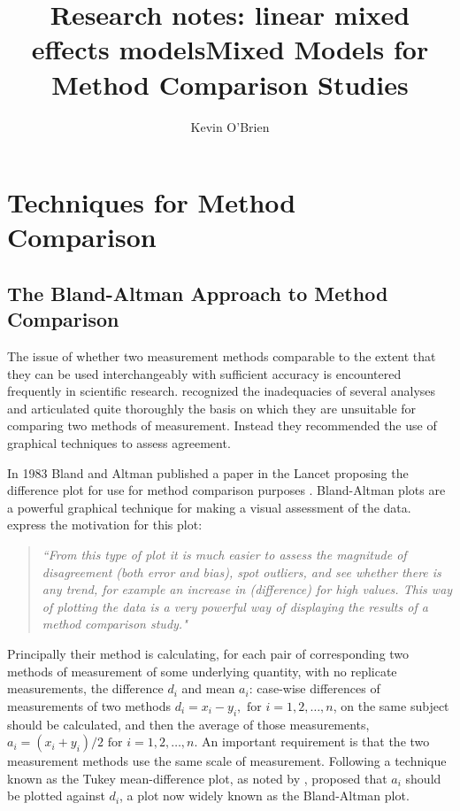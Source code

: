 \documentclass[12pt, a4paper]{report}
\title{Research notes: linear mixed effects models}
\author{ } \date{ }
\theoremstyle{plain}
\theoremstyle{definition}
\theoremstyle{remark}
\begin{document}
	\author{Kevin O'Brien}
	\title{Mixed Models for Method Comparison Studies}
	\tableofcontents
	
	\newpage
	\chapter{Techniques for Method Comparison}
	\section{The Bland-Altman Approach to Method Comparison}
	
The issue of whether two measurement methods comparable to the 	extent that they can be used interchangeably with sufficient accuracy is encountered frequently in scientific research. \citet{BA83} recognized the inadequacies of several analyses and articulated quite thoroughly the basis on which they are unsuitable for comparing two methods of measurement. Instead they recommended the use of graphical techniques to assess agreement. 



	
In 1983 Bland and Altman published a paper in the Lancet proposing the difference plot for use for method comparison purposes \citep{BA83}. 	Bland-Altman plots are a powerful graphical technique for making
a visual assessment of the data. \citet*{BA83} express the
motivation for this plot:
\begin{quote}
\textit{
	``From this type of plot it is much easier to assess the magnitude
	of disagreement (both error and bias), spot outliers, and see
	whether there is any trend, for example an increase in
	(difference) for high values. This way of plotting the data is a
	very powerful way of displaying the results of a method comparison
	study."}
\end{quote}
 Principally their method is calculating, for each pair of corresponding two methods of measurement of some underlying quantity, with no replicate measurements, the difference $d_i$ and mean $a_i$: case-wise differences of measurements of two methods $d_{i} = x_{i}-y_{i}, \mbox{ for }i=1,2,\dots,n$, on the same subject should be calculated, and then the average of those measurements, $a_{i} = (x_{i} + y_{i})/2 \mbox{ for }i=1,2,\dots, n$. An important requirement is that the two measurement methods use the same scale of measurement. Following a technique known as the Tukey mean-difference plot, as noted by \citet{kozak2014including}, \citet{BA83} proposed that $a_i$ should be plotted against $d_i$, a plot now widely known as the Bland-Altman plot.
\end{document}
